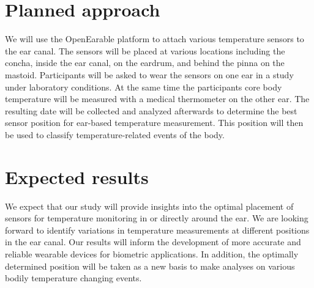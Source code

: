 


\section{Planned approach}
We will use the OpenEarable platform to attach various temperature sensors to the ear canal. The sensors will be placed at various locations including the concha, inside the ear canal, on the eardrum, and behind the pinna on the mastoid. Participants will be asked to wear the sensors on one ear in a study under laboratory conditions.
At the same time the participants core body temperature will be measured with a medical thermometer on the other ear.
The resulting date will be collected and analyzed afterwards to determine the best sensor position for ear-based temperature measurement. This position will then be used to classify temperature-related events of the body.



\section{Expected results}
We expect that our study will provide insights into the optimal placement of sensors for temperature monitoring in or directly around the ear. We are looking forward to identify variations in temperature measurements at different positions in the ear canal. Our results will inform the development of more accurate and reliable wearable devices for biometric applications. In addition, the optimally determined position will be taken as a new basis to make analyses on various bodily temperature changing events.

